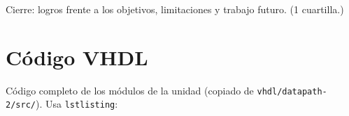 \documentclass[llncs]{llncs}
\begin{document}
Cierre: logros frente a los objetivos, limitaciones y trabajo futuro.
(1 cuartilla.)




\appendix
\section{Código VHDL}
\label{app:codigo}

Código completo de los módulos de la unidad (copiado de
\texttt{vhdl/datapath-2/src/}). Usa \texttt{lstlisting}:

\end{document}
